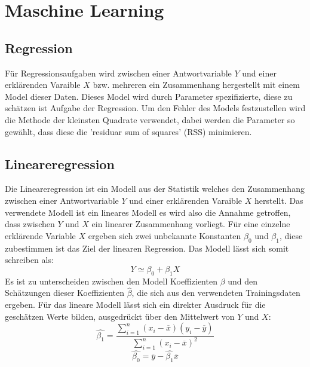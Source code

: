 
\section{Maschine Learning}
\label{sec:maschinelearning}
\subsection{Regression}
Für Regressionsaufgaben wird zwischen einer Antwortvariable \(Y\) und einer erklärenden Varaible \(X\) bzw. mehreren ein Zusammenhang hergestellt mit einem Model dieser Daten. Dieses Model wird durch Parameter spezifizierte, diese zu schätzen ist Aufgabe der Regression. Um den Fehler des Models festzustellen wird die Methode der kleinsten Quadrate verwendet, dabei werden die Parameter so gewählt, dass diese die 'residuar sum of squares' (RSS) minimieren.
\subsection{Lineareregression}
Die Lineareregression ist ein Modell aus der Statistik welches den Zusammenhang zwischen einer Antwortvariable \(Y\) und einer erklärenden Varaible \(X\) herstellt. Das verwendete Modell ist ein lineares Modell es wird also die Annahme getroffen, dass zwischen \(Y\) und \(X\) ein linearer Zusammenhang vorliegt. Für eine einzelne erklärende Variable \(X\) ergeben sich zwei unbekannte Konstanten \(\beta_0\) und \(\beta_1\), diese zubestimmen ist das Ziel der linearen Regression. Das Modell lässt sich somit schreiben als:
\begin{equation}
    Y \simeq \beta_0 + \beta_1 X
    \label{eq:linreg1}
\end{equation}
Es ist zu unterscheiden zwischen den Modell Koeffizienten \(\beta\) und den Schätzungen dieser Koeffizienten \(\hat{\beta}\), die sich aus den verwendeten Trainingsdaten ergeben. 
Für das lineare Modell lässt sich ein direkter Ausdruck für die geschätzen Werte bilden, ausgedrückt über den Mittelwert von \(Y\) und \(X\):
\begin{equation}
    \hat{\beta_1} = \frac{\sum_{i=1}^{n}(x_i - \overline{x})(y_i - \overline{y})}{\sum_{i=1}^{n}(x_i - \overline{x})^2}
\end{equation}
\begin{equation}
    \hat{\beta_0} = \overline{y} - \hat{\beta_1}\overline{x}
\end{equation}

\cite{james2013}



